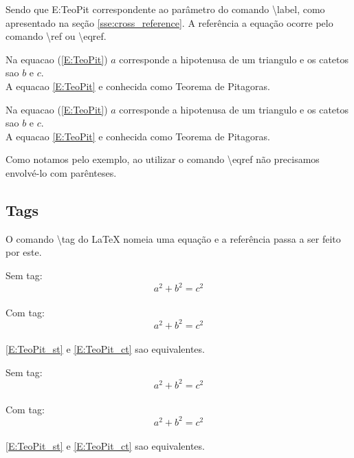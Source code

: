 Sendo que \textsf{E:TeoPit} correspondente ao parâmetro do comando \textbackslash\textsf{label}, como apresentado na seção \ref{sse:cross_reference}. A referência a equação ocorre pelo comando \textbackslash\textsf{ref} ou \textbackslash\textsf{eqref}. \\
\begin{minipage}[t]{0.47\linewidth} \vspace{-8pt}
    \begin{latexcode}
        Na equacao (\ref{E:TeoPit}) $a$ corresponde a hipotenusa de um triangulo e os catetos sao $b$ e $c$. \\
        A equacao \eqref{E:TeoPit} e conhecida como Teorema de Pitagoras.
    \end{latexcode}
\end{minipage} \hfill
\begin{minipage}[t]{0.47\linewidth} \vspace{0pt}
    Na equacao (\ref{E:TeoPit}) $a$ corresponde a hipotenusa de um triangulo e os catetos sao $b$ e $c$. \\
    A equacao \eqref{E:TeoPit} e conhecida como Teorema de Pitagoras.
\end{minipage}
Como notamos pelo exemplo, ao utilizar o comando \textbackslash\textsf{eqref} não precisamos envolvé-lo com parênteses.

\subsection{Tags}
O comando \textsf{\textbackslash tag} do LaTeX nomeia uma equação e a referência passa a ser feito por este. \\
\begin{minipage}[t]{0.47\linewidth} \vspace{-8pt}
    \begin{latexcode}
        Sem tag: \begin{equation}\label{E:TeoPit_st}
            a^2 + b^2 = c^2
        \end{equation} \\
        Com tag: \begin{equation}\label{E:TeoPit_ct} 
            \tag{Teorema de Pitagoras}
            a^2 + b^2 = c^2
        \end{equation} \\
        \eqref{E:TeoPit_st} e \eqref{E:TeoPit_ct} sao equivalentes.
    \end{latexcode}
\end{minipage} \hfill
\begin{minipage}[t]{0.47\linewidth} \vspace{0pt}
    Sem tag: \begin{equation}\label{E:TeoPit_st}
        a^2 + b^2 = c^2
    \end{equation} \\
    Com tag: \begin{equation}\label{E:TeoPit_ct} 
        \tag{Teorema de Pitagoras}
        a^2 + b^2 = c^2
    \end{equation} \\
    \eqref{E:TeoPit_st} e \eqref{E:TeoPit_ct} sao equivalentes.
\end{minipage}

